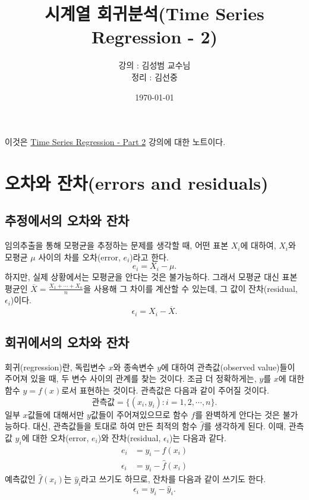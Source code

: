 \documentclass{article}
\begin{document}
\title{시계열 회귀분석(Time Series Regression - 2)}
\author{강의 : 김성범 교수님\\ 정리 :  김선중}
\date{\today}
\maketitle

이것은 \href{https://youtu.be/pxG4ZlHJ570}{Time Series Regression - Part 2} 강의에 대한 노트이다.
\tableofcontents

\newpage

\section{오차와 잔차(errors and residuals)}
\subsection{추정에서의 오차와 잔차}
임의추출을 통해 모평균을 추정하는 문제를 생각할 때, 어떤 표본 \(X_i\)에 대하여, \(X_i\)와 모평균 \(\mu\) 사이의 차를 오차(error, \(e_i\))라고 한다.
\[e_i = X_i-\mu.\]
하지만, 실제 상황에서는 모평균을 안다는 것은 불가능하다.
그래서 모평균 대신 표본평균인 \(\overline X = \frac{X_1+\cdots+X_n}n\)을 사용해 그 차이를 계산할 수 있는데, 그 값이 잔차(residual, \(\epsilon_i\))이다.
\[\epsilon_i = X_i-\overline X.\]
\subsection{회귀에서의 오차와 잔차}
회귀(regression)란, 독립변수 \(x\)와 종속변수 \(y\)에 대하여 관측값(observed value)들이 주어져 있을 때, 두 변수 사이의 관계를 찾는 것이다.
조금 더 정확하게는, \(y\)를 \(x\)에 대한 함수 \(y=f(x)\)로서 표현하는 것이다.
관측값은 다음과 같이 주어질 것이다.
\[\text{관측값} = \{(x_i,y_i):i=1,2,\cdots,n\}.\]
일부 \(x\)값들에 대해서만 \(y\)값들이 주어져있으므로 함수 \(f\)를 완벽하게 안다는 것은 불가능하다.
대신, 관측값들을 토대로 하여 만든 최적의 함수 \(\hat f\)를 생각하게 된다.
이때, 관측값 \(y_i\)에 대한 오차(error, \(e_i\))와 잔차(residual, \(\epsilon_i\))는 다음과 같다.
\begin{align}
e_i&=y_i-f(x_i)\label{error}\\
\epsilon_i&=y_i-\hat f(x_i)\label{residual}
\end{align}
예측값인 \(\hat f(x_i)\)는 \(\hat y_i\)라고 쓰기도 하므로, 잔차를 다음과 같이 쓰기도 한다.
\[\epsilon_i=y_i-\hat y_i.\]
\end{document}
